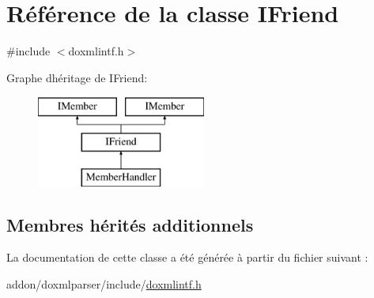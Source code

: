\hypertarget{class_i_friend}{}\section{Référence de la classe I\+Friend}
\label{class_i_friend}


{\ttfamily \#include $<$doxmlintf.\+h$>$}

Graphe d\textquotesingle{}héritage de I\+Friend\+:\begin{figure}[H]
\begin{center}
\leavevmode
\includegraphics[height=3.000000cm]{class_i_friend}
\end{center}
\end{figure}
\subsection*{Membres hérités additionnels}


La documentation de cette classe a été générée à partir du fichier suivant \+:\begin{DoxyCompactItemize}
\item 
addon/doxmlparser/include/\hyperlink{include_2doxmlintf_8h}{doxmlintf.\+h}\end{DoxyCompactItemize}
